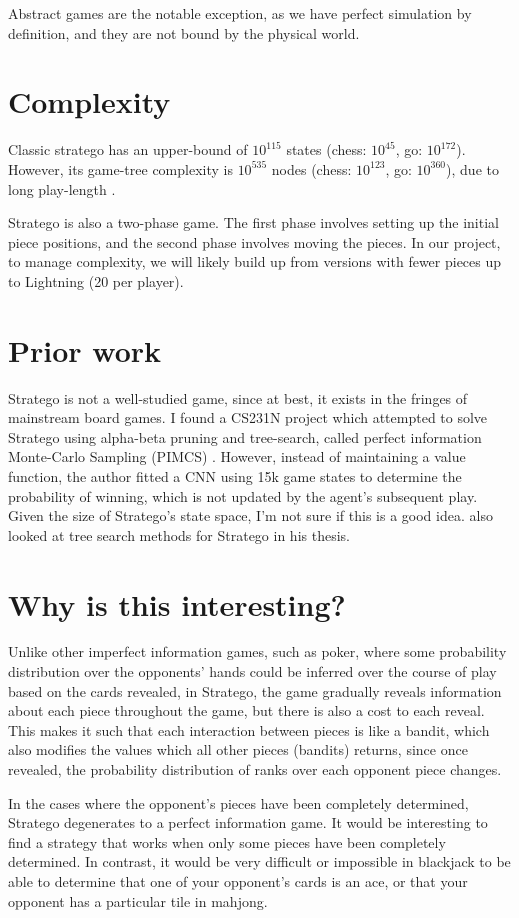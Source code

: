\documentclass{article}
\begin{document}
Abstract games are the notable exception, as we have perfect simulation by definition, and they are not bound by the physical world.

\section{Complexity}
Classic stratego has an upper-bound of $10^{115}$ states (chess: $10^{45}$, go: $10^{172}$). However, its game-tree complexity is $10^{535}$ nodes (chess: $10^{123}$, go: $10^{360}$), due to long play-length \cite{arts10}.

Stratego is also a two-phase game. The first phase involves setting up the initial piece positions, and the second phase involves moving the pieces. In our project, to manage complexity, we will likely build up from versions with fewer pieces up to Lightning (20 per player).

\section{Prior work}
Stratego is not a well-studied game, since at best, it exists in the fringes of mainstream board games. I found a CS231N project \cite{smith2015} which attempted to solve Stratego using alpha-beta pruning and tree-search, called perfect information Monte-Carlo Sampling (PIMCS) \cite{long2010}. However, instead of maintaining a value function, the author fitted a CNN using 15k game states to determine the probability of winning, which is not updated by the agent's subsequent play. Given the size of Stratego's state space, I'm not sure if this is a good idea. \cite{arts10} also looked at tree search methods for Stratego in his thesis.

\section{Why is this interesting?}
Unlike other imperfect information games, such as poker, where some probability distribution over the opponents' hands could be inferred over the course of play based on the cards revealed, in Stratego, the game gradually reveals information about each piece throughout the game, but there is also a cost to each reveal. This makes it such that each interaction between pieces is like a bandit, which also modifies the values which all other pieces (bandits) returns, since once revealed, the probability distribution of ranks over each opponent piece changes.

In the cases where the opponent's pieces have been completely determined, Stratego degenerates to a perfect information game. It would be interesting to find a strategy that works when only some pieces have been completely determined. In contrast, it would be very difficult or impossible in blackjack to be able to determine that one of your opponent's cards is an ace, or that your opponent has a particular tile in mahjong.
\end{document}
